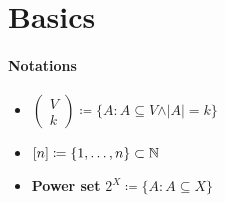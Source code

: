 \section{Basics}

\paragraph{Notations}
\begin{itemize}
  \item $ \left( \begin{smallmatrix}
    V \\ k
  \end{smallmatrix} \right) \coloneqq \{ A : A \subseteq V \wedge \vert A \vert = k \} $
  \item $ [n] \coloneqq \{ 1, \dots, n \} \subset \mathbb{N} $
  \item \textbf{Power set} $ 2^X \coloneqq \{ A : A \subseteq X \} $
\end{itemize}

